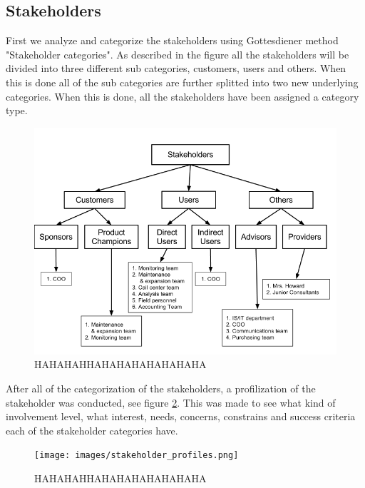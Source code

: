 \documentclass[a4paper]{article}
\begin{document}
\subsection{Stakeholders}
\label{sub:stakeholders}
First we analyze and categorize the stakeholders using Gottesdiener method "Stakeholder categories". As described in the figure all the stakeholders will be divided into three different sub categories, customers, users and others. When this is done all of the sub categories are further splitted into two new underlying categories. When this is done, all the stakeholders have been assigned a category type. 

\begin{figure}[H]
	\includegraphics[width=1\textwidth]{images/stakeholder_categorization.png}
	\caption{HAHAHAHHAHAHAHAHAHAHAHA}
	\label{figure:stakeholder_categorization}
\end{figure}

After all of the categorization of the stakeholders, a profilization of the stakeholder was conducted, see figure \ref{figure:stakeholder_profiles}. This was made to see what kind of involvement level, what interest, needs, concerns, constrains and success criteria each of the stakeholder categories have.

\begin{figure}[H]
	\texttt{[image: images/stakeholder\_profiles.png]}
	\caption{HAHAHAHHAHAHAHAHAHAHAHA}
	\label{figure:stakeholder_profiles}
\end{figure}
\end{document}

